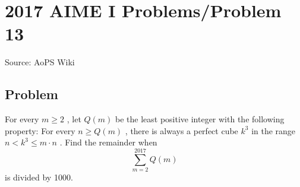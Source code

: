 \documentclass[12pt]{article}
\begin{document}
\section*{{2017 AIME I Problems/Problem 13}}
Source: AoPS Wiki

\subsection*{Problem}
For every $m \geq 2$ , let $Q(m)$ be the least positive integer with the following property: For every $n \geq Q(m)$ , there is always a perfect cube $k^3$ in the range $n < k^3 \leq m \cdot n$ . Find the remainder when \[\sum_{m = 2}^{2017} Q(m)\] is divided by 1000.
\end{document}
